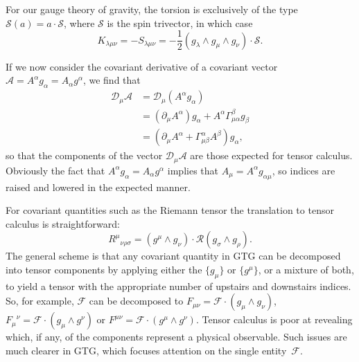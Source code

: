 \documentclass[a4paper]{article}
\numberwithin{equation}{section}
\newcommand{\nn}{\nonumber}
\newcommand{\dt}{\! \cdot \!}
\newcommand{\wdg}{\! \wedge \!}
\newcommand{\half}{{\textstyle \frac{1}{2}}}
\newcommand{\alp}{\alpha}
\newcommand{\bet}{\beta}
\newcommand{\lam}{\lambda}
\newcommand{\Gam}{\Gamma}
\newcommand{\cla}{{\mathcal{A}}}
\newcommand{\cld}{{\mathcal{D}}}
\newcommand{\clf}{{\mathcal{F}}}
\newcommand{\clr}{{\mathcal{R}}}
\newcommand{\cls}{{\mathcal{S}}}
\begin{document}
%
For our gauge theory of gravity, the torsion is exclusively of the
type $\cls(a)=a\cdot\cls$, where $\cls$ is the spin trivector, in which
case
%
\begin{equation}
K_{\lam \mu \nu} = -S_{\lam \mu \nu} =- \half (g_\lam \wdg g_\mu \wdg
g_\nu) \dt \cls.
\end{equation}
 

If we now consider the covariant derivative of a covariant vector
$\cla=A^\alp g_\alp= A_\alp g^\alp$, we find that
%
\begin{align}
\cld_\mu \cla 
&= \cld_\mu (A^\alp g_\alp) \nn \\
&= (\partial_\mu A^\alp) g_\alp + A^\alp \Gam^\bet_{\mu \alp} g_\bet
\nn \\
&= (\partial_\mu A^\alp + \Gam^\alp_{\mu \bet} A^\bet) g_\alp,
\end{align}
%
so that the components of the vector $\cld_\mu \cla$ are those
expected for tensor calculus.  Obviously the fact that $A^\alp
g_\alp= A_\alp g^\alp$ implies that $A_\mu=A^\alp g_{\alp \mu}$, so
indices are raised and lowered in the expected manner.


For covariant quantities such as the Riemann tensor the translation
to tensor calculus is straightforward:
%
\begin{equation}
{R^\mu}_{\nu \rho \sigma} = (g^\mu \wdg g_\nu) \dt \clr(g_\sigma \wdg
g_\rho).
\end{equation}
%
The general scheme is that any covariant quantity in GTG can be
decomposed into tensor components by applying either the $\{g_\mu\}$
or $\{g^\mu\}$, or a mixture of both, to yield a tensor with the
appropriate number of upstairs and downstairs indices.  So, for
example, $\clf$ can be decomposed to $F_{\mu \nu}=\clf\cdot (g_\mu
\wdg g_\nu)$, ${F_\mu}^\nu=\clf\cdot (g_\mu \wdg g^\nu)$ or $F^{\mu
\nu}=\clf\cdot (g^\mu \wdg g^\nu)$.  Tensor calculus is poor at
revealing which, if any, of the components represent a physical
observable.  Such issues are much clearer in GTG, which focuses
attention on the single entity~$\clf$.
\end{document}

